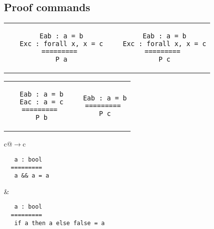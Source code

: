 \begin{landscape}
\begin{small}
\begin{multicols*}{3}[\begin{center}\section*{}\end{center}]
\subsection*{Proof commands}
  \begin{tabular}{c@{$\to$}c} 
  \begin{minipage}{0.15\textwidth}\begin{lstlisting}
   Eab : a = b
   Exc : forall x, x = c
  =========
   P a
  \end{lstlisting}\end{minipage}
  &
  \begin{minipage}{0.15\textwidth}\begin{lstlisting}
   Eab : a = b
   Exc : forall x, x = c
  =========
   P c
  \end{lstlisting}\end{minipage}
  \end{tabular}
  \begin{tabular}{c@{$\to$}c} 
  \begin{minipage}{0.15\textwidth}\begin{lstlisting}
   Eab : a = b
   Eac : a = c
  =========
   P b
  \end{lstlisting}\end{minipage}
  &
  \begin{minipage}{0.15\textwidth}\begin{lstlisting}
   Eab : a = b
  =========
   P c
  \end{lstlisting}\end{minipage}
  \end{tabular}
  \begin{tabular}{c@{$\to$}c} 
  \begin{minipage}{0.15\textwidth}\begin{lstlisting}
   a : bool
  =========
   a && a = a
  \end{lstlisting}\end{minipage}
  &
  \begin{minipage}{0.15\textwidth}\begin{lstlisting}
   a : bool
  =========
   if a then a else false = a
  \end{lstlisting}\end{minipage}

\end{tabular}
\end{multicols*}
\end{small}
\end{landscape}
